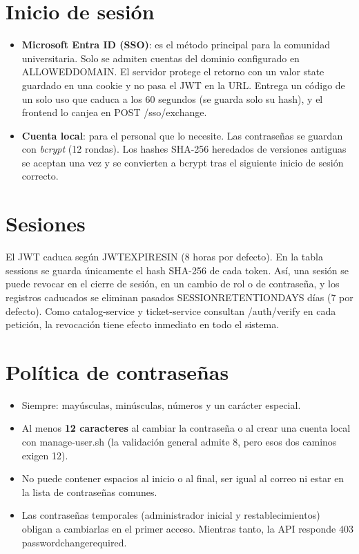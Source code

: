 \documentclass[11pt,a4paper,oneside]{report}
\newcommand{\codus}{\textunderscore\allowbreak}
\DeclareRobustCommand{\cod}[1]{{\small\ttfamily\let\_\codus #1}}
\begin{document}
\section{Inicio de sesión}
\begin{itemize}
  \item \textbf{Microsoft Entra ID (SSO)}: es el método principal para la comunidad universitaria. Solo
        se admiten cuentas del dominio configurado en \cod{ALLOWED\_DOMAIN}. El servidor protege el retorno con un
        valor \cod{state} guardado en una cookie y no pasa el JWT en la URL. Entrega un código de un
        solo uso que caduca a los 60 segundos (se guarda solo su hash), y el frontend lo canjea en \cod{POST /sso/exchange}.
  \item \textbf{Cuenta local}: para el personal que lo necesite. Las contraseñas se guardan con
        \emph{bcrypt} (12 rondas). Los hashes SHA-256 heredados de versiones antiguas se aceptan una vez
        y se convierten a bcrypt tras el siguiente inicio de sesión correcto.
\end{itemize}

\section{Sesiones}
El JWT caduca según \cod{JWT\_EXPIRES\_IN} (8 horas por defecto). En la tabla \cod{sessions} se
guarda únicamente el hash SHA-256 de cada token. Así, una sesión se puede revocar en el cierre de sesión, en un cambio de
rol o de contraseña, y los registros caducados se eliminan pasados \cod{SESSION\_RETENTION\_DAYS} días (7 por defecto).
Como catalog-service y ticket-service consultan \cod{/auth/verify} en cada petición, la revocación
tiene efecto inmediato en todo el sistema.

\section{Política de contraseñas}
\begin{itemize}
  \item Siempre: mayúsculas, minúsculas, números y un carácter especial.
  \item Al menos \textbf{12 caracteres} al cambiar la contraseña o al crear una cuenta local con \cod{manage-user.sh}
        (la validación general admite 8, pero esos dos caminos exigen 12).
  \item No puede contener espacios al inicio o al final, ser igual al correo ni estar en la lista de contraseñas comunes.
  \item Las contraseñas temporales (administrador inicial y restablecimientos) obligan a cambiarlas en el primer acceso.
        Mientras tanto, la API responde \cod{403 password\_change\_required}.
\end{itemize}
\end{document}
